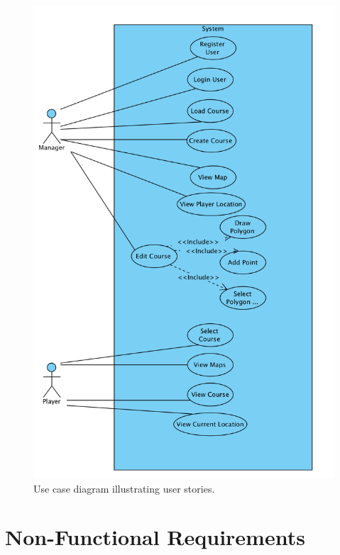 \documentclass{article}
\begin{document}
    \begin{figure}[H]
        \centering
        \includegraphics[scale=0.6]{UsecaseDiagram}
        \caption{Use case diagram illustrating user stories.}
        \label{fig:usecase}
    \end{figure}

    \newpage


    \section{Non-Functional Requirements}
\end{document}
